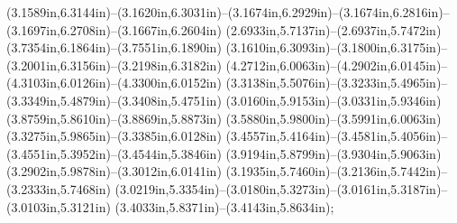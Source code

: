 (3.1589in,6.3144in)--(3.1620in,6.3031in)--(3.1674in,6.2929in)--(3.1674in,6.2816in)--(3.1697in,6.2708in)--(3.1667in,6.2604in) (2.6933in,5.7137in)--(2.6937in,5.7472in) (3.7354in,6.1864in)--(3.7551in,6.1890in) (3.1610in,6.3093in)--(3.1800in,6.3175in)--(3.2001in,6.3156in)--(3.2198in,6.3182in) (4.2712in,6.0063in)--(4.2902in,6.0145in)--(4.3103in,6.0126in)--(4.3300in,6.0152in) (3.3138in,5.5076in)--(3.3233in,5.4965in)--(3.3349in,5.4879in)--(3.3408in,5.4751in) (3.0160in,5.9153in)--(3.0331in,5.9346in) (3.8759in,5.8610in)--(3.8869in,5.8873in) (3.5880in,5.9800in)--(3.5991in,6.0063in) (3.3275in,5.9865in)--(3.3385in,6.0128in) (3.4557in,5.4164in)--(3.4581in,5.4056in)--(3.4551in,5.3952in)--(3.4544in,5.3846in) (3.9194in,5.8799in)--(3.9304in,5.9063in) (3.2902in,5.9878in)--(3.3012in,6.0141in) (3.1935in,5.7460in)--(3.2136in,5.7442in)--(3.2333in,5.7468in) (3.0219in,5.3354in)--(3.0180in,5.3273in)--(3.0161in,5.3187in)--(3.0103in,5.3121in) (3.4033in,5.8371in)--(3.4143in,5.8634in);
